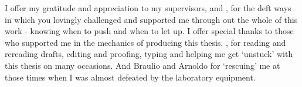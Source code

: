 \documentclass[
11pt, 
oneside,
english,
onehalfspacing,
onehalfspacing,
parskip,
headsepline,
]{MastersDoctoralThesis}
\begin{document}
\begin{acknowledgements}


I offer my gratitude and appreciation to my supervisors, \supname and \cosupname, for the deft ways in which you lovingly challenged and supported me through out the whole of this work - knowing when to push and when to let up. I offer special thanks to those who supported me in the mechanics of producing this thesis. \supname, for reading and rereading drafts, editing and proofing, typing and helping me get ‘unstuck’ with this thesis on many occasions. And Braulio and Arnoldo for ‘rescuing’ me at those times when I was almost defeated by the laboratory equipment.

\end{acknowledgements}

\end{document}
